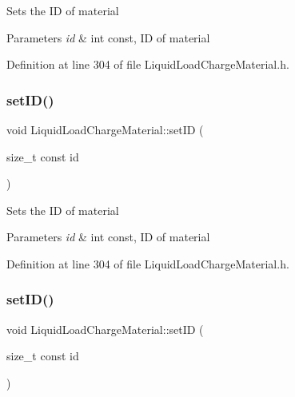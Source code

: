 Sets the ID of material 
\begin{DoxyParams}{Parameters}
{\em id} & int const, ID of material \\
\hline
\end{DoxyParams}


Definition at line 304 of file Liquid\+Load\+Charge\+Material.\+h.

\mbox{\label{class_liquid_load_charge_material_a3f6654f1d9387366e0ca7620ecc41361}} 
\subsubsection{\texorpdfstring{set\+I\+D()}{setID()}\hspace{0.1cm}{\footnotesize\ttfamily [2/3]}}
{\footnotesize\ttfamily void Liquid\+Load\+Charge\+Material\+::set\+ID (\begin{DoxyParamCaption}\item[{size\+\_\+t const}]{id }\end{DoxyParamCaption})\hspace{0.3cm}{\ttfamily [inline]}}

Sets the ID of material 
\begin{DoxyParams}{Parameters}
{\em id} & int const, ID of material \\
\hline
\end{DoxyParams}


Definition at line 304 of file Liquid\+Load\+Charge\+Material.\+h.

\mbox{\label{class_liquid_load_charge_material_a3f6654f1d9387366e0ca7620ecc41361}} 
\subsubsection{\texorpdfstring{set\+I\+D()}{setID()}\hspace{0.1cm}{\footnotesize\ttfamily [3/3]}}
{\footnotesize\ttfamily void Liquid\+Load\+Charge\+Material\+::set\+ID (\begin{DoxyParamCaption}\item[{size\+\_\+t const}]{id }\end{DoxyParamCaption})\hspace{0.3cm}{\ttfamily [inline]}}

